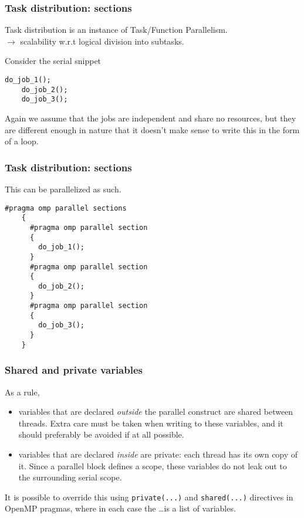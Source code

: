 \begin{frame}[fragile]
  \frametitle{Task distribution: sections}

Task distribution is an instance of Task/Function Parallelism.\\
$\rightarrow$ scalability w.r.t logical division into subtasks.

\bigskip
  Consider the serial snippet
  \begin{lstlisting}[style=c]
    do_job_1();
    do_job_2();
    do_job_3();
  \end{lstlisting}
  Again we assume that the jobs are independent and share no resources, but they
  are different enough in nature that it doesn't make sense to write this in the
  form of a loop.
\end{frame}

\begin{frame}[fragile]
  \frametitle{Task distribution: sections}
  This can be parallelized as such.
  \begin{lstlisting}[style=c, basicstyle=\ttfamily\footnotesize]
    #pragma omp parallel sections
    {
      #pragma omp parallel section
      {
        do_job_1();
      }
      #pragma omp parallel section
      {
        do_job_2();
      }
      #pragma omp parallel section
      {
        do_job_3();
      }
    }
  \end{lstlisting}
\end{frame}

\begin{frame}[fragile]
  \frametitle{Shared and private variables}
  As a rule,
  \begin{itemize}
  \item variables that are declared \emph{outside} the parallel construct are
    shared between threads. Extra care must be taken when writing to these
    variables, and it should preferably be avoided if at all possible.
  \item variables that are declared \emph{inside} are private: each thread has
    its own copy of it. Since a parallel block defines a scope, these variables
    do not leak out to the surrounding serial scope.
  \end{itemize}
  It is possible to override this using \texttt{private(...)} and
  \texttt{shared(...)} directives in OpenMP pragmas, where in each case the
  \ldots is a list of variables.
\end{frame}

